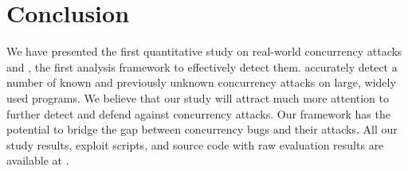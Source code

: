 \section{Conclusion}\label{sec:conclusion}


We have presented the first quantitative study on real-world concurrency 
attacks and \xxx, the first analysis framework to effectively detect them. \xxx 
accurately detect a number of known and previously unknown concurrency attacks 
on large, widely used programs. We believe that our study will attract much 
more attention to further detect and defend against concurrency attacks. Our 
\xxx framework has the potential to bridge the gap between concurrency bugs and 
their attacks. All our study results, exploit scripts, and \xxx source code 
with raw evaluation results are available at \github.

